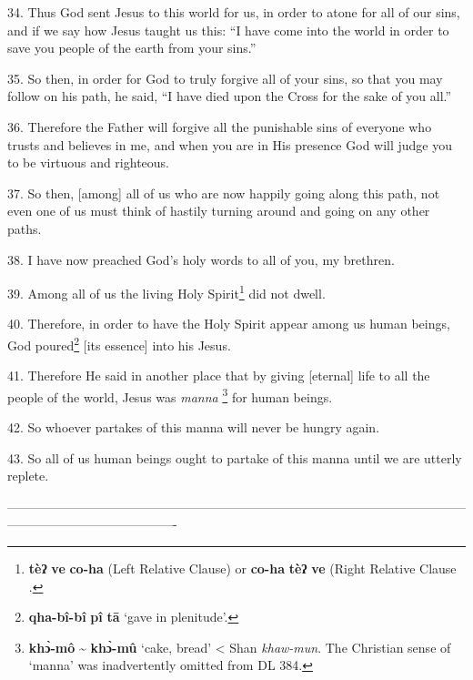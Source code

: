 34. Thus God sent Jesus to this world for us, in order to atone for all of our
sins, and if we say how Jesus taught us this: ``I have come into the world in order
to save you people of the earth from your sins.''

35. So then, in order for God to truly forgive all of your sins, so that you may
follow on his path, he said, ``I have died upon the Cross for the sake of you all.''

36. Therefore the Father will forgive all the punishable sins of everyone who trusts
and believes in me, and when you are in His presence God will judge you to be virtuous
and righteous.

37. So then, [among] all of us who are now happily going along this path, not even
one of us must think of hastily turning around and going on any other paths.

38. I have now preached God's holy words to all of you, my brethren.

39. Among all of us the living Holy Spirit\footnote{\textbf{tèʔ} \textbf{ve} \textbf{co-ha} (Left Relative Clause) or \textbf{co-ha} \textbf{tèʔ} \textbf{ve} (Right Relative Clause .} did not dwell.

40. Therefore, in order to have the Holy Spirit appear among us human beings, God
poured\footnote{\textbf{qha-bî-bî} \textbf{pî} \textbf{tā} `gave in plenitude'.} [its essence] into his Jesus.

41. Therefore He said in another place that by giving [eternal] life to all the
people of the world, Jesus was \textit{manna }\footnote{\textbf{khɔ̀-mô} \textasciitilde{ \textbf{khɔ̀-mû} }`cake, bread' < Shan \textit{khaw-mun}. The Christian sense of `manna' was inadvertently omitted from DL 384.} for human beings.

42. So whoever partakes of this manna will never be hungry again.

43. So all of us human beings ought to partake of this manna until we are utterly
replete.

----------------------------------------------------------------------------------------------------------------------------------------------------

